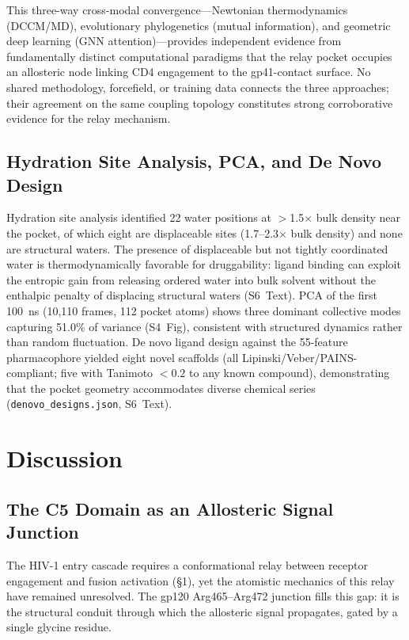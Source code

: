 \documentclass[11pt,a4paper]{article}
\begin{document}
This three-way cross-modal convergence---Newtonian thermodynamics (DCCM/MD), evolutionary phylogenetics (mutual information), and geometric deep learning (GNN attention)---provides independent evidence from fundamentally distinct computational paradigms that the relay pocket occupies an allosteric node linking CD4 engagement to the gp41-contact surface. No shared methodology, forcefield, or training data connects the three approaches; their agreement on the same coupling topology constitutes strong corroborative evidence for the relay mechanism.

\subsection{Hydration Site Analysis, PCA, and De Novo Design}

Hydration site analysis identified 22 water positions at $>$1.5$\times$ bulk density near the pocket, of which eight are displaceable sites (1.7--2.3$\times$ bulk density) and none are structural waters. The presence of displaceable but not tightly coordinated water is thermodynamically favorable for druggability: ligand binding can exploit the entropic gain from releasing ordered water into bulk solvent without the enthalpic penalty of displacing structural waters \citep{Halgren2009} (S6~Text). PCA of the first 100~ns (10,110 frames, 112 pocket atoms) shows three dominant collective modes capturing 51.0\% of variance (S4~Fig), consistent with structured dynamics rather than random fluctuation. De novo ligand design against the 55-feature pharmacophore yielded eight novel scaffolds (all Lipinski/Veber/PAINS-compliant; five with Tanimoto $<0.2$ to any known compound), demonstrating that the pocket geometry accommodates diverse chemical series (\texttt{denovo\_designs.json}, S6~Text).

\section{Discussion}

\subsection{The C5 Domain as an Allosteric Signal Junction}

The HIV-1 entry cascade requires a conformational relay between receptor engagement and fusion activation (\S1), yet the atomistic mechanics of this relay have remained unresolved. The gp120 Arg465--Arg472 junction fills this gap: it is the structural conduit through which the allosteric signal propagates, gated by a single glycine residue.
\end{document}
